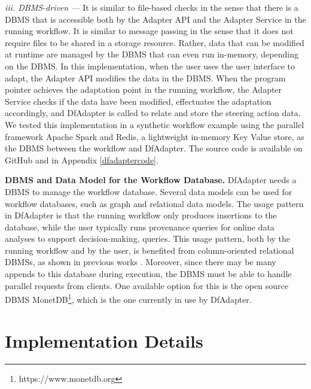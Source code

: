\emph{iii. DBMS-driven ---}
It is similar to file-based checks in the sense that
there is a DBMS that is accessible both by the Adapter API and the Adapter Service in the running workflow.
It is similar to message passing in the sense that it does
not require files to be shared in a storage resource.
Rather, data that
can be modified at runtime are managed by the DBMS that can even run
in-memory, depending on the DBMS.
In this implementation, when the user uses the user interface to adapt, the Adapter API modifies the data in the DBMS.
When the program pointer achieves the adaptation point in the running
workflow, the Adapter Service checks if the data have been modified, effectuates
the adaptation accordingly, and DfAdapter is called to relate and store the steering action data.
We tested this implementation in a synthetic workflow example using the parallel framework
Apache Spark and Redis, a lightweight in-memory Key Value store, as the
DBMS between the workflow and DfAdapter. The source code is available on
GitHub \cite{DfAdapterGitHubDfAdapter} and in Appendix \ref{dfadaptercode}.

\textbf{DBMS and Data Model for the Workflow Database.} DfAdapter
needs a DBMS to manage the workflow database. Several data models can
be used for workflow databases, such as graph and relational data
models. The usage pattern in DfAdapter is that the running workflow only
produces insertions to the database, while the user typically
runs provenance queries for online data analyses to support
decision-making, \ie{}  queries.
This usage pattern, both by
the running workflow and by the user, is benefited from column-oriented
relational DBMSs, as shown in previous works
\cite{Silva2017Raw,Camata2018In}.
Moreover, since there may be many appends to this database during
execution, the DBMS must be able to handle parallel requests from
clients. One available option for this is the open source DBMS MonetDB\footnote{https://www.monetdb.org}, which is the one currently in use by DfAdapter.

\section{Implementation Details}
\label{dfadapter-implementation-details}

